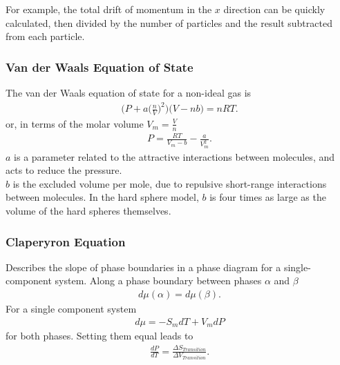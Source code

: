 \documentclass{beamer}
\newenvironment{noheadline}{
	\setbeamertemplate{headline}{}
	\addtobeamertemplate{frametitle}{\vspace*{-0.9\baselineskip}}{}
}{}
\newcommand{\backupend}{
   \setcounter{framenumber}{\value{finalframe}}
}
\begin{document}
\begin{noheadline}
\begin{frame}
For example, the total drift of momentum in the $x$ direction can be quickly calculated, then divided by the number of particles and the result subtracted from each particle.
\end{frame}

\begin{frame}
\frametitle{Van der Waals Equation of State}
The van der Waals equation of state for a non-ideal gas is
\begin{align*}
\bigg( P + a \bigg(\frac{n}{V}\bigg)^{2} \bigg)\big( V - n b \big) = n R T.
\end{align*}
or, in terms of the molar volume $V_{m} = \frac{V}{n}$
\begin{align*}
P = \frac{R T}{V_{m} - b} - \frac{a}{V_{m}^2}.
\end{align*}
$a$ is a parameter related to the attractive interactions between molecules, and acts to reduce the pressure.\\
$b$ is the excluded volume per mole, due to repulsive short-range interactions between molecules. In the hard sphere model, $b$ is four times as large as the volume of the hard spheres themselves.
\end{frame}

\begin{frame}
\frametitle{Claperyron Equation}
Describes the slope of phase boundaries in a phase diagram for a single-component system. Along a phase boundary between phases $\alpha$ and $\beta$
\begin{align*}
d\mu(\alpha) = d\mu(\beta).
\end{align*}
For a single component system
\begin{align*}
d \mu = - S_{m} dT + V_{m} dP
\end{align*}
for both phases. Setting them equal leads to
\begin{align*}
\frac{d P}{d T} = \frac{\Delta S_{Transition}}{\Delta V_{Transition}}.
\end{align*}
\end{frame}

\end{noheadline}
\backupend
			
\end{document}
